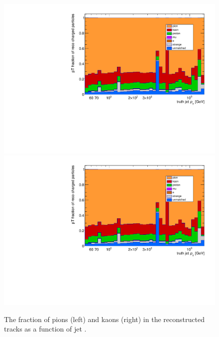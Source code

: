 \begin{figure}
\centering
\includegraphics[scale=0.3, page=4]{figures/jet_comp_study_powheg_Tight_pTFraction.pdf}
\includegraphics[scale=0.3, page=5]{figures/jet_comp_study_powheg_Tight_pTFraction.pdf}
\caption {The fraction of pions (left) and kaons (right) in the reconstructed tracks as a function of jet \pT.}
\label{fig:fraction pions and kaons}
\end{figure}


